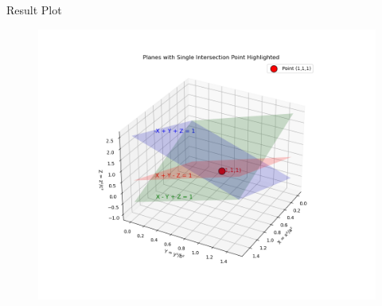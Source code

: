 \documentclass{beamer}
\numberwithin{equation}{section}
\theoremstyle{remark}
\begin{document}
\begin{frame}{Result Plot}
 \begin{figure}[H]
     \centering
     \includegraphics[width=0.8\columnwidth]{figs/fig1.png}
     \caption*{}
     \label{fig:fig1}
 \end{figure}
 
\end{frame}
\end{document}
